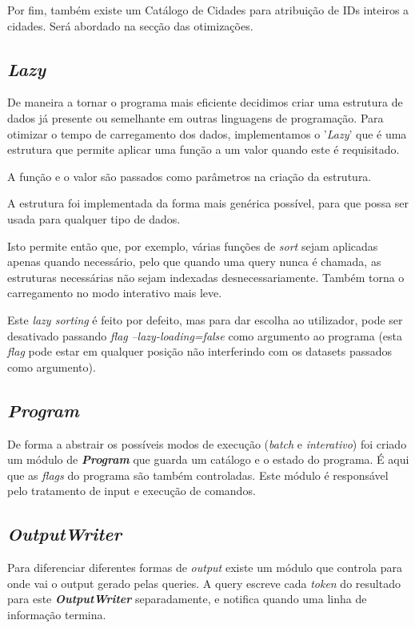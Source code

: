 \documentclass{article}
\begin{document}
            Por fim, também existe um Catálogo de Cidades para atribuição de
            IDs inteiros a cidades. Será abordado na secção das otimizações.  
            
        \subsection{\emph{Lazy}}
            De maneira a tornar o programa mais eficiente decidimos criar uma
            estrutura de dados já presente ou semelhante em outras linguagens de programação.
            Para otimizar o tempo de carregamento dos dados, implementamos o '\emph{Lazy}' que é uma
            estrutura que permite aplicar uma função a um valor quando este é requisitado.

            A função e o valor são passados como parâmetros na criação da estrutura.

            A estrutura foi implementada da forma mais genérica possível, para que
            possa ser usada para qualquer tipo de dados.

            Isto permite então que, por exemplo, várias funções de \emph{sort} sejam aplicadas
            apenas quando necessário, pelo que quando uma query nunca é chamada, as estruturas necessárias
            não sejam indexadas desnecessariamente. Também torna o carregamento no modo interativo
            mais leve. 

            Este \emph{lazy sorting} é feito por defeito, mas para dar escolha ao utilizador,
            pode ser desativado passando \emph{flag} \emph{--lazy-loading=false}
            como argumento ao programa (esta \emph{flag} pode estar em qualquer
            posição não interferindo com os datasets passados como argumento).
        \subsection{\emph{Program}}
            De forma a abstrair os possíveis modos de execução (\textit{batch} e \textit{interativo})
            foi criado um módulo de \textit{\textbf{Program}} que guarda um catálogo e o estado do programa.
            É aqui que as \textit{flags} do programa são também controladas.
            Este módulo é responsável pelo tratamento de input e execução de comandos.
        \subsection{\emph{OutputWriter}}
            Para diferenciar diferentes formas de \textit{output} existe um módulo que controla
            para onde vai o output gerado pelas queries.
            A query escreve cada \textit{token} do resultado para este \textit{\textbf{OutputWriter}} separadamente,
            e notifica quando uma linha de informação termina.
            
\end{document}
